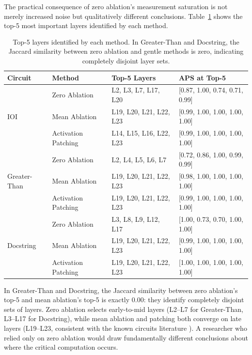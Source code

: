 \documentclass[pdflatex,sn-mathphys-num]{sn-jnl}
\begin{document}
The practical consequence of zero ablation's measurement saturation is not merely increased noise but qualitatively different conclusions. Table~\ref{tab:impact} shows the top-5 most important layers identified by each method.

\begin{table}[t]
\centering
\caption{Top-5 layers identified by each method. In Greater-Than and Docstring, the Jaccard similarity between zero ablation and gentle methods is zero, indicating completely disjoint layer sets.}
\label{tab:impact}
\begin{tabular}{llll}
\toprule
Circuit & Method & Top-5 Layers & APS at Top-5 \\
\midrule
\multirow{3}{*}{IOI} & Zero Ablation & L2, L3, L7, L17, L20 & {[}0.87, 1.00, 0.74, 0.71, 0.99{]} \\
 & Mean Ablation & L19, L20, L21, L22, L23 & {[}0.99, 1.00, 1.00, 1.00, 1.00{]} \\
 & Activation Patching & L14, L15, L16, L22, L23 & {[}0.99, 1.00, 1.00, 1.00, 1.00{]} \\
\midrule
\multirow{3}{*}{Greater-Than} & Zero Ablation & L2, L4, L5, L6, L7 & {[}0.72, 0.86, 1.00, 0.99, 0.99{]} \\
 & Mean Ablation & L19, L20, L21, L22, L23 & {[}0.98, 1.00, 1.00, 1.00, 1.00{]} \\
 & Activation Patching & L19, L20, L21, L22, L23 & {[}0.99, 1.00, 1.00, 1.00, 1.00{]} \\
\midrule
\multirow{3}{*}{Docstring} & Zero Ablation & L3, L8, L9, L12, L17 & {[}1.00, 0.73, 0.70, 1.00, 1.00{]} \\
 & Mean Ablation & L19, L20, L21, L22, L23 & {[}0.99, 1.00, 1.00, 1.00, 1.00{]} \\
 & Activation Patching & L19, L20, L21, L22, L23 & {[}1.00, 1.00, 1.00, 1.00, 1.00{]} \\
\bottomrule
\end{tabular}
\end{table}

In Greater-Than and Docstring, the Jaccard similarity between zero ablation's top-5 and mean ablation's top-5 is exactly $0.00$: they identify completely disjoint sets of layers. Zero ablation selects early-to-mid layers (L2--L7 for Greater-Than, L3--L17 for Docstring), while mean ablation and patching both converge on late layers (L19--L23, consistent with the known circuits literature \citep{Wang2022,Nanda2023}). A researcher who relied only on zero ablation would draw fundamentally different conclusions about where the critical computation occurs.
\end{document}
